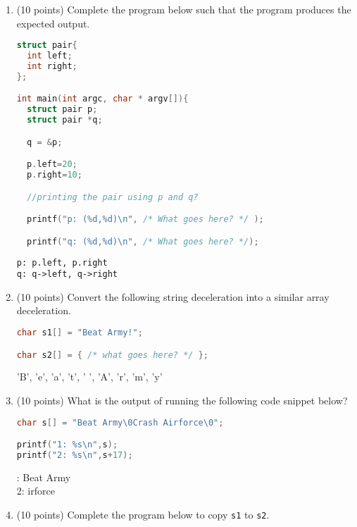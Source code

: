 \documentclass{article}[9pt]
\newenvironment{answerfont}{\fontfamily{qhv}\selectfont}{\par}
\newenvironment{myanswer}{\begin{mdframed}\begin{answerfont}}{\end{answerfont}\end{mdframed}}
\begin{document}
\begin{enumerate}
\item (10 points) Complete the program below such that the program produces the expected output.

\begin{lstlisting}[language=c]
struct pair{
  int left;
  int right;
};

int main(int argc, char * argv[]){
  struct pair p;
  struct pair *q;

  q = &p;

  p.left=20;
  p.right=10;

  //printing the pair using p and q?

  printf("p: (%d,%d)\n", /* What goes here? */ );

  printf("q: (%d,%d)\n", /* What goes here? */);
\end{lstlisting}

\begin{myanswer}
\texttt{p: p.left, p.right}\\
\texttt{q: q->left, q->right}
\end{myanswer}

\item (10 points) Convert the following string deceleration into a similar array deceleration.

\begin{lstlisting}[language=c]
char s1[] = "Beat Army!";

char s2[] = { /* what goes here? */ };
\end{lstlisting}

\begin{myanswer}
 'B', 'e', 'a', 't', ' ', 'A', 'r', 'm', 'y'
\end{myanswer}

\item (10 points) What is the output of running the following code snippet below?

\begin{lstlisting}[language=c]
char s[] = "Beat Army\0Crash Airforce\0";

printf("1: %s\n",s);
printf("2: %s\n",s+17);
\end{lstlisting}

\begin{myanswer}
1: Beat Army\\
2: irforce
\end{myanswer}

\item (10 points) Complete the program below to copy \texttt{s1} to \texttt{s2}.


\end{enumerate}
\end{document}
